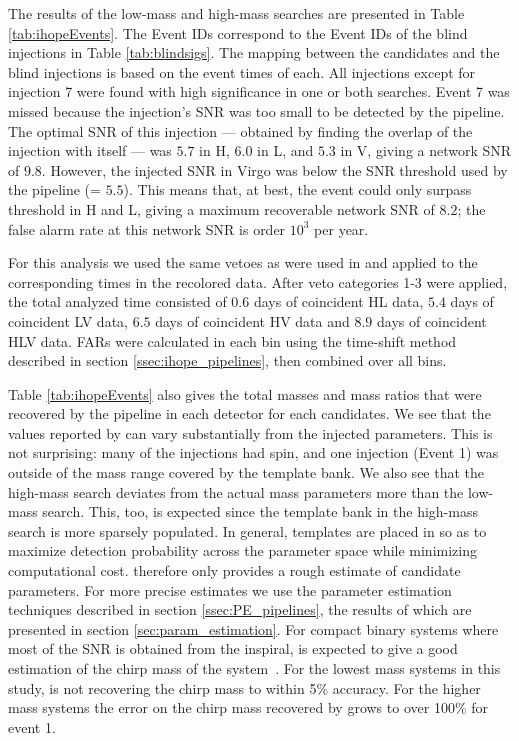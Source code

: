 The results of the low-mass and high-mass \ihope{} searches are presented in
Table \ref{tab:ihopeEvents}. The Event IDs correspond to the Event IDs of the
blind injections in Table \ref{tab:blindsigs}. The mapping between the \ihope{}
candidates and the blind injections is based on the event times of each. All
injections except for injection 7 were found with high significance in one or
both searches. Event 7 was missed because the injection's SNR was too small to
be detected by the pipeline. The optimal SNR of this injection --- obtained
by finding the overlap of the injection with itself --- was $5.7$ in H, $6.0$ in 
L,
and $5.3$ in V, giving a network SNR of $9.8$. However, the injected SNR in 
Virgo was
below the SNR threshold used by the \ihope{} pipeline (= $5.5$). This
means that, at best, the event could only surpass threshold in H and L, giving
a maximum recoverable network SNR of $8.2$; the false alarm rate at this
network SNR is order $10^3$ per year.

For this analysis we used the same vetoes as were used in
\cite{Colaboration:2011np} and \cite{Aasi:2012rja} applied to
the corresponding times in the recolored data. After veto categories
1-3 were applied, the total analyzed time consisted of $0.6$ days of
coincident HL data, $5.4$ days of coincident LV data, $6.5$ days of
coincident HV data and $8.9$ days of coincident HLV data.  FARs were
calculated in each bin using the time-shift method described in
section \ref{ssec:ihope_pipelines}, then combined over all bins.

Table \ref{tab:ihopeEvents} also gives the total masses and mass ratios that 
were recovered by the \ihope{} pipeline in each detector for each candidates. 
We see that the values reported by \ihope{} can vary substantially
from the injected parameters. This is not surprising: many of the injections
had spin, and one injection (Event 1) was outside of the mass range covered by 
the template bank.
We also see that the high-mass search deviates from the actual mass parameters
more than the low-mass search. This, too, is expected since the template bank in
the high-mass search is more sparsely populated. In general, templates are
placed in \ihope{} so as to maximize detection probability across the parameter
space while minimizing computational cost. \ihope{} therefore only provides a
rough estimate of candidate parameters. For more precise estimates we use the
parameter estimation techniques described in section \ref{ssec:PE_pipelines}, 
the
results of which are presented in section \ref{sec:param_estimation}. For 
compact binary systems where most of the SNR is obtained from the inspiral, 
\ihope{} is expected to give a good estimation of the chirp mass of the 
system~\cite{Cutler:1994ys,Poisson:1995ef,Hannam:2013uu}. For the lowest mass 
systems in this study, \ihope{} is not recovering the chirp mass to within 5\% 
accuracy. For the higher mass systems the error on the chirp mass recovered by 
\ihope{} grows to over 100\% for event 1.


